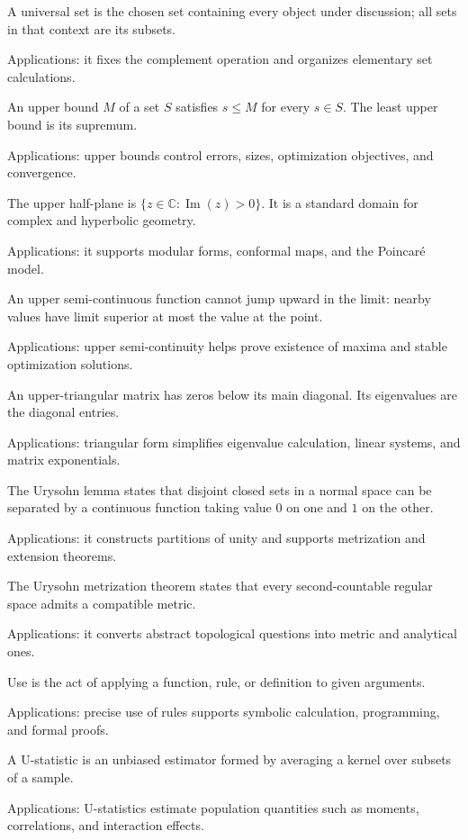 A universal set is the chosen set containing every object under discussion; all sets in that context are its subsets. \par\noindent Applications: it fixes the complement operation and organizes elementary set calculations.

An upper bound $M$ of a set $S$ satisfies $s\leq M$ for every $s\in S$. The least upper bound is its supremum. \par\noindent Applications: upper bounds control errors, sizes, optimization objectives, and convergence.

The upper half-plane is $\{z\in\mathbb C:\operatorname{Im}(z)>0\}$. It is a standard domain for complex and hyperbolic geometry. \par\noindent Applications: it supports modular forms, conformal maps, and the Poincaré model.

An upper semi-continuous function cannot jump upward in the limit: nearby values have limit superior at most the value at the point. \par\noindent Applications: upper semi-continuity helps prove existence of maxima and stable optimization solutions.

An upper-triangular matrix has zeros below its main diagonal. Its eigenvalues are the diagonal entries. \par\noindent Applications: triangular form simplifies eigenvalue calculation, linear systems, and matrix exponentials.

The Urysohn lemma states that disjoint closed sets in a normal space can be separated by a continuous function taking value $0$ on one and $1$ on the other. \par\noindent Applications: it constructs partitions of unity and supports metrization and extension theorems.

The Urysohn metrization theorem states that every second-countable regular space admits a compatible metric. \par\noindent Applications: it converts abstract topological questions into metric and analytical ones.

Use is the act of applying a function, rule, or definition to given arguments. \par\noindent Applications: precise use of rules supports symbolic calculation, programming, and formal proofs.

A U-statistic is an unbiased estimator formed by averaging a kernel over subsets of a sample. \par\noindent Applications: U-statistics estimate population quantities such as moments, correlations, and interaction effects.

